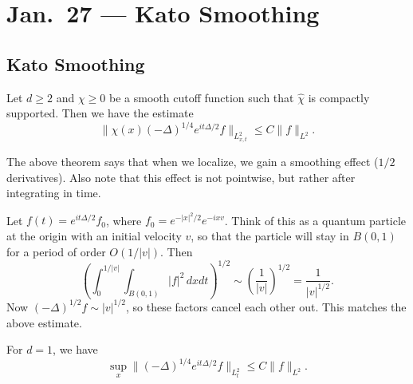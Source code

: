 \chapter{Jan.~27 --- Kato Smoothing}

\section{Kato Smoothing}

\begin{theorem}
  Let $d \ge 2$ and $\chi \ge 0$ be a smooth
  cutoff function such that $\widehat{\chi}$ is
  compactly supported. Then we have the estimate
  \[
    \|\chi(x) (-\Delta)^{1 / 4} e^{i t \Delta / 2} f\|_{L^2_{x, t}} \le C\|f\|_{L^2}.
  \]
\end{theorem}

\begin{remark}
  The above theorem says that when we localize, we
  gain a smoothing effect ($1 / 2$ derivatives).
  Also note that this effect is not pointwise, but rather
  after integrating in time.
\end{remark}

\begin{remark}
  Let $f(t) = e^{it \Delta / 2} f_0$, where
  $f_0 = e^{-|x|^2 / 2} e^{-ix v}$. Think of this
  as a quantum particle at the origin with an initial
  velocity $v$, so
  that the particle will stay in
  $B(0, 1)$ for a period of order $O(1 / |v|)$. Then
  \[
    \left(\int_0^{1 / |v|} \int_{B(0, 1)} |f|^2\, dx dt\right)^{1 / 2}
    \sim \left(\frac{1}{|v|}\right)^{1 / 2}
    = \frac{1}{|v|^{1 / 2}}.
  \]
  Now $(-\Delta)^{1 / 2} f \sim |v|^{1 / 2}$, so these
  factors cancel each other out.
  This matches the above estimate.
\end{remark}

\begin{theorem}
  For $d = 1$, we have
  \[
    \sup_x \|(-\Delta)^{1 / 4} e^{it \Delta / 2} f\|_{L^2_t}
    \le C \|f\|_{L^2}.
  \]
\end{theorem}

